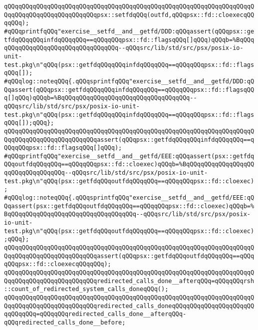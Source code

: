\verb|qQQqqQQqqQQqqQQqqQQqqQQqqQQqqQQqqQQqqQQqqQQqqQQqqQQqqQQqqQQqqQQqqQQqqQQqqQQqqQQqqQQqqQQqqQQqqQQqpsx::setfdqQQq(outfd,qQQqpsx::fd::cloexecqQQqqQQq);|\newline
\newline
\verb|#qQQqprintfqQQq"exercise__setfd__and__getfd/DDD:qQQqassert(qQQqpsx::getfdqQQqqQQqinfdqQQqqQQq==qQQqqQQqpsx::fd::flagsqQQq[]qQQq)qQQqb=%BqQQqqQQqqQQqqQQqqQQqqQQqqQQqqQQqqQQq--qQQqsrc/lib/std/src/psx/posix-io-unit-test.pkg\n"qQQq(psx::getfdqQQqqQQqinfdqQQqqQQq==qQQqqQQqpsx::fd::flagsqQQq[]);|\newline
\verb|#qQQqlog::noteqQQq{.qQQqsprintfqQQq"exercise__setfd__and__getfd/DDD:qQQqassert(qQQqpsx::getfdqQQqqQQqinfdqQQqqQQq==qQQqqQQqpsx::fd::flagsqQQq[]qQQq)qQQqb=%BqQQqqQQqqQQqqQQqqQQqqQQqqQQqqQQqqQQq--qQQqsrc/lib/std/src/psx/posix-io-unit-test.pkg\n"qQQq(psx::getfdqQQqqQQqinfdqQQqqQQq==qQQqqQQqpsx::fd::flagsqQQq[]);qQQq};|\newline
\verb|qQQqqQQqqQQqqQQqqQQqqQQqqQQqqQQqqQQqqQQqqQQqqQQqqQQqqQQqqQQqqQQqqQQqqQQqqQQqqQQqqQQqqQQqqQQqqQQqassert(qQQqpsx::getfdqQQqqQQqinfdqQQqqQQq==qQQqqQQqpsx::fd::flagsqQQq[]qQQq);|\newline
\verb|#qQQqprintfqQQq"exercise__setfd__and__getfd/EEE:qQQqassert(psx::getfdqQQqoutfdqQQqqQQq==qQQqqQQqpsx::fd::cloexec)qQQqb=%BqQQqqQQqqQQqqQQqqQQqqQQqqQQqqQQqqQQq--qQQqsrc/lib/std/src/psx/posix-io-unit-test.pkg\n"qQQq(psx::getfdqQQqoutfdqQQqqQQq==qQQqqQQqpsx::fd::cloexec);|\newline
\verb|#qQQqlog::noteqQQq{.qQQqsprintfqQQq"exercise__setfd__and__getfd/EEE:qQQqassert(psx::getfdqQQqoutfdqQQqqQQq==qQQqqQQqpsx::fd::cloexec)qQQqb=%BqQQqqQQqqQQqqQQqqQQqqQQqqQQqqQQqqQQq--qQQqsrc/lib/std/src/psx/posix-io-unit-test.pkg\n"qQQq(psx::getfdqQQqoutfdqQQqqQQq==qQQqqQQqpsx::fd::cloexec);qQQq};|\newline
\verb|qQQqqQQqqQQqqQQqqQQqqQQqqQQqqQQqqQQqqQQqqQQqqQQqqQQqqQQqqQQqqQQqqQQqqQQqqQQqqQQqqQQqqQQqqQQqqQQqassert(qQQqpsx::getfdqQQqoutfdqQQqqQQq==qQQqqQQqpsx::fd::cloexecqQQqqQQq);|\newline
\newline
\verb|qQQqqQQqqQQqqQQqqQQqqQQqqQQqqQQqqQQqqQQqqQQqqQQqqQQqqQQqqQQqqQQqqQQqqQQqqQQqqQQqqQQqqQQqqQQqqQQqredirected_calls_done__afterqQQq=qQQqqQQqrsh::count_of_redirected_system_calls_doneqQQq();|\newline
\verb|qQQqqQQqqQQqqQQqqQQqqQQqqQQqqQQqqQQqqQQqqQQqqQQqqQQqqQQqqQQqqQQqqQQqqQQqqQQqqQQqqQQqqQQqqQQqqQQqredirected_calls_doneqQQqqQQqqQQqqQQqqQQqqQQqqQQqqQQq=qQQqqQQqredirected_calls_done__afterqQQq-qQQqredirected_calls_done__before;|\newline
